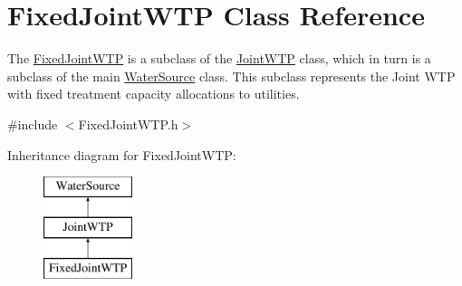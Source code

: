 \hypertarget{classFixedJointWTP}{}\section{Fixed\+Joint\+W\+TP Class Reference}
\label{classFixedJointWTP}


The {\ttfamily \mbox{\hyperlink{classFixedJointWTP}{Fixed\+Joint\+W\+TP}}} is a subclass of the {\ttfamily \mbox{\hyperlink{classJointWTP}{Joint\+W\+TP}}} class, which in turn is a subclass of the main {\ttfamily \mbox{\hyperlink{classWaterSource}{Water\+Source}}} class. This subclass represents the Joint W\+TP with fixed treatment capacity allocations to utilities.  




{\ttfamily \#include $<$Fixed\+Joint\+W\+T\+P.\+h$>$}

Inheritance diagram for Fixed\+Joint\+W\+TP\+:\begin{figure}[H]
\begin{center}
\leavevmode
\includegraphics[height=3.000000cm]{classFixedJointWTP}
\end{center}
\end{figure}

